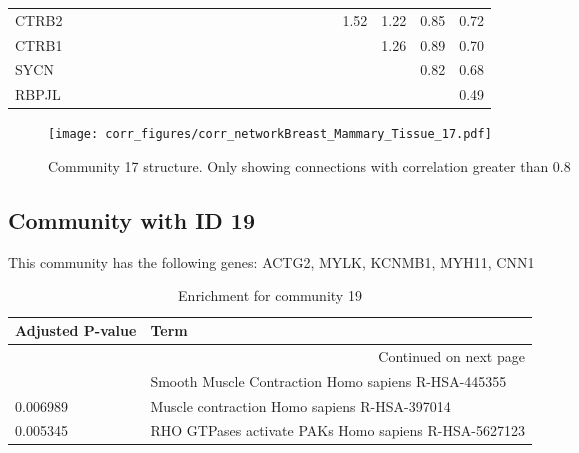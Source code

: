 \begin{longtable}{lrrrrrrrrrrrrrrrrrrrrrrr}
CTRB2    &              &              &              &             &             &             &             &              &            &            &            &             &           &             &                &           &               &           &             &        1.52 &       1.22 &        0.85 &        0.72 \\
CTRB1    &              &              &              &             &             &             &             &              &            &            &            &             &           &             &                &           &               &           &             &             &       1.26 &        0.89 &        0.70 \\
SYCN     &              &              &              &             &             &             &             &              &            &            &            &             &           &             &                &           &               &           &             &             &            &        0.82 &        0.68 \\
RBPJL    &              &              &              &             &             &             &             &              &            &            &            &             &           &             &                &           &               &           &             &             &            &             &        0.49 \\
\end{longtable}


\begin{figure}[h!]
\centering
\texttt{[image: corr\_figures/corr\_networkBreast\_Mammary\_Tissue\_17.pdf]}
\caption{Community 17 structure. Only showing connections with correlation greater than 0.8}
\end{figure}




\subsection*{Community with ID 19}
This community has the following genes: ACTG2, MYLK, KCNMB1, MYH11, CNN1
\\
\begin{longtable}{p{2.4cm}p{14.5cm}}
\caption{Enrichment for community 19}\\
\toprule
Adjusted \newline P-value &                                                  Term \\
\midrule
\endhead
\midrule
\multicolumn{2}{r}{{Continued on next page}} \\
\midrule
\endfoot

\bottomrule
\endlastfoot
                 0.000062 &   Smooth Muscle Contraction Homo sapiens R-HSA-445355 \\
                 0.006989 &          Muscle contraction Homo sapiens R-HSA-397014 \\
                 0.005345 &  RHO GTPases activate PAKs Homo sapiens R-HSA-5627123 \\
\end{longtable}


